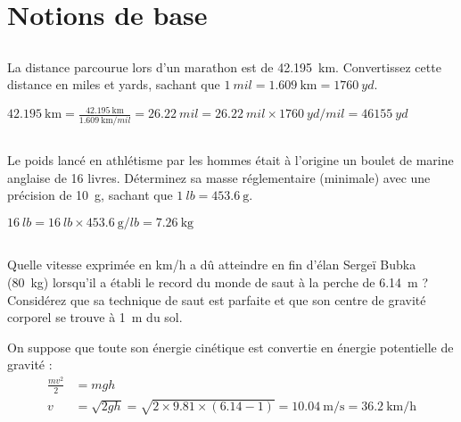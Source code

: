 
\section{Notions de base}

\subsection{}
La distance parcourue lors d'un marathon est de \SI{42,195}{\kilo\meter}. Convertissez cette distance en miles et yards, sachant que $\SI{1}{mil} = \SI{1.609}{\kilo\meter} = \SI{1760}{yd}$.

\begin{solution}
    $ \SI{42.195}{\kilo\meter} = \frac{\SI{42.195}{\kilo\meter}}{\SI{1.609}{\kilo\meter\per mil}} = \SI{26.22}{mil} = \SI{26.22}{mil} \times \SI{1760}{yd \per mil} = \SI{46155}{yd} $
\end{solution}

\subsection{}
Le poids lancé en athlétisme par les hommes était à l'origine un boulet de marine anglaise de 16 livres. Déterminez sa masse réglementaire (minimale) avec une précision de \SI{10}{\gram}, sachant que $\SI{1}{lb} = \SI{453.6}{\gram}$.

\begin{solution}
    $ \SI{16}{lb} = \SI{16}{lb} \times \SI{453.6}{\gram\per lb} = \SI{7.26}{\kilo\gram} $
\end{solution}

\subsection{}
Quelle vitesse exprimée en km/h a dû atteindre en fin d'élan Sergeï Bubka (\SI{80}{\kilo\gram}) lorsqu'il a établi le record du monde de saut à la perche de \SI{6.14}{\meter} ? Considérez que sa technique de saut est parfaite et que son centre de gravité corporel se trouve à \SI{1}{\meter} du sol.

\begin{solution}
    On suppose que toute son énergie cinétique est convertie en énergie potentielle de gravité :
    \begin{align*}
        \frac{mv^2}{2} &= mgh \\
        v &= \sqrt{2gh} = \sqrt{2 \times 9.81 \times (6.14 - 1)} = \SI{10.04}{\meter\per\second} = \SI{36.2}{\kilo\meter\per\hour}
    \end{align*}
\end{solution}

